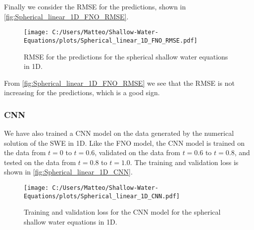 Finally we consider the RMSE for the predictions, shown in \autoref{fig:Spherical_linear_1D_FNO_RMSE}.
\begin{figure}[H]
    \centering
    \texttt{[image: C:/Users/Matteo/Shallow-Water-Equations/plots/Spherical\_linear\_1D\_FNO\_RMSE.pdf]}
    \caption{RMSE for the predictions for the spherical shallow water equations in 1D.}\label{fig:Spherical_linear_1D_FNO_RMSE}
\end{figure}
From \autoref{fig:Spherical_linear_1D_FNO_RMSE} we see that the RMSE is not increasing for the predictions, which is a good sign.

\subsubsection{CNN}
We have also trained a CNN model on the data generated by the numerical solution of the SWE in 1D.
Like the FNO model, the CNN model is trained on the data from $t = 0$ to $t = 0.6$, validated on the data from $t = 0.6$ to $t = 0.8$, and tested on the data from $t = 0.8$ to $t = 1.0$.
The training and validation loss is shown in \autoref{fig:Spherical_linear_1D_CNN}.
\begin{figure}[H]
    \centering
    \texttt{[image: C:/Users/Matteo/Shallow-Water-Equations/plots/Spherical\_linear\_1D\_CNN.pdf]}
    \caption{Training and validation loss for the CNN model for the spherical shallow water equations in 1D.}\label{fig:Spherical_linear_1D_CNN}
\end{figure}

